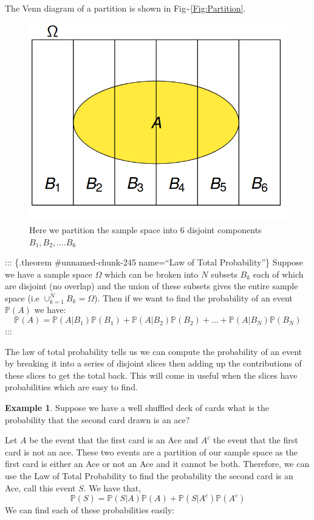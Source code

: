 \documentclass[
]{book}
\newcommand{\prob}[1]{{\mathbb{P}(#1)}}
\theoremstyle{definition}
\theoremstyle{definition}
\newtheorem{example}{Example}[chapter]
\theoremstyle{definition}
\theoremstyle{definition}
\theoremstyle{remark}
\begin{document}
The Venn diagram of a partition is shown in Fig\textasciitilde{}\ref{Fig:Partition}.

\begin{figure}
\includegraphics[width=0.5\linewidth]{Partition_pic} \caption{Here we partition the sample space into 6 disjoint components $B_1, B_2, .... B_6$}\label{fig:addPartitionDiagram}
\end{figure}

::: \{.theorem \#unnamed-chunk-245 name=``Law of Total Probability''\}
Suppose we have a sample space \(\Omega\) which can be broken into \(N\) subsets \(B_k\) each of which are disjoint (no overlap) and the union of these subsets gives the entire sample space (i.e \(\cup_{k=1}^N B_k=\Omega\)). Then if we want to find the probability of an event \(\prob{A}\) we have: \[\prob{A}=\prob{A|B_1}\prob{B_1}+\prob{A|B_2}\prob{B_2}+...+\prob{A|B_N}\prob{B_N}\]
:::

The law of total probability tells us we can compute the probability of an event by breaking it into a series of disjoint slices then adding up the contributions of these slices to get the total back. This will come in useful when the slices have probabilities which are easy to find.

\begin{example}
\protect\hypertarget{exm:unnamed-chunk-246}{}\label{exm:unnamed-chunk-246}Suppose we have a well shuffled deck of cards what is the probability that the second card drawn is an ace?
\end{example}

Let \(A\) be the event that the first card is an Ace and \(A^c\) the event that the first card is not an ace. These two events are a partition of our sample space as the first card is either an Ace or not an Ace and it cannot be both. Therefore, we can use the Law of Total Probability to find the probability the second card is an Ace, call this event \(S\). We have that,
\[
  \prob{S}=\prob{S|A} \prob{A}+\prob{S|A^c}\prob{A^c}  
\]
We can find each of these probabilities easily:
\end{document}
